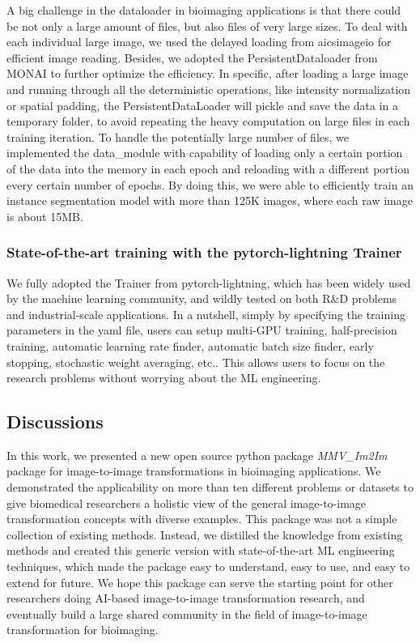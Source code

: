 A big challenge in the dataloader in bioimaging applications is that there could be not only a large amount of files, but also files of very large sizes. To deal with each individual large image, we used the delayed loading from aicsimageio for efficient image reading. Besides, we adopted the PersistentDataloader from MONAI to further optimize the efficiency. In specific, after loading a large image and running through all the deterministic operations, like intensity normalization or spatial padding, the PersistentDataLoader will pickle and save the data in a temporary folder, to avoid repeating the heavy computation on large files in each training iteration. To handle the potentially large number of files, we implemented the data\_module with capability of loading only a certain portion of the data into the memory in each epoch and reloading with a different portion every certain number of epochs. By doing this, we were able to efficiently train an instance segmentation model with more than 125K images, where each raw image is about 15MB.

\hypertarget{state-of-the-art-training-with-the-pytorch-lightning-trainer}{%
\subsubsection{State-of-the-art training with the pytorch-lightning Trainer}\label{state-of-the-art-training-with-the-pytorch-lightning-trainer}}

We fully adopted the Trainer from pytorch-lightning, which has been widely used by the machine learning community, and wildly tested on both R\&D problems and industrial-scale applications. In a nutshell, simply by specifying the training parameters in the yaml file, users can setup multi-GPU training, half-precision training, automatic learning rate finder, automatic batch size finder, early stopping, stochastic weight averaging, etc.. This allows users to focus on the research problems without worrying about the ML engineering.

\hypertarget{discussions}{%
\subsection{Discussions}\label{discussions}}

In this work, we presented a new open source python package \emph{MMV\_Im2Im} package for image-to-image transformations in bioimaging applications. We demonstrated the applicability on more than ten different problems or datasets to give biomedical researchers a holistic view of the general image-to-image transformation concepts with diverse examples. This package was not a simple collection of existing methods. Instead, we distilled the knowledge from existing methods and created this generic version with state-of-the-art ML engineering techniques, which made the package easy to understand, easy to use, and easy to extend for future. We hope this package can serve the starting point for other researchers doing AI-based image-to-image transformation research, and eventually build a large shared community in the field of image-to-image transformation for bioimaging.

